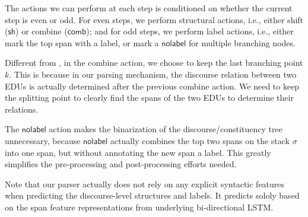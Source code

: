 \documentclass[11pt,letterpaper]{article}
\newcommand{\shift}{\ensuremath{\mathsf{sh}}\xspace}
\newcommand{\comb}{\ensuremath{\mathsf{comb}}\xspace}
\newcommand{\nolabel}{\ensuremath{\mathsf{nolabel}}\xspace}
\begin{document}
The actions we can perform at each step is conditioned on whether the current step is even or odd.
For even steps, we perform structural actions, i.e., either shift (\shift) or combine (\comb);
and for odd steps, we perform label actions, i.e., either mark the top span with a label, or 
mark a \nolabel for multiple branching nodes.

Different from , in the combine action, we choose to keep the last 
branching point $k$. This is because in our parsing mechanism,
the discourse relation between two EDUs is actually determined after the previous combine action.
We need to keep the splitting point to clearly find the spans of the two EDUs to determine their relations.

The \nolabel action makes the binarization of the discourse/constituency tree unnecessary,
because \nolabel actually combines the top two spans on the stack $\sigma$ into one span,
but without annotating the new span a label.
This greatly simplifies the pre-processing and post-processing efforts needed.


\begin{table}
  \begin{center}
  \end{center}
  \caption{Accuracies on PTB-RST at constituency and discourse levels. 
    \label{tab:internal-acc}
  }
  \vspace{-0.4cm}
\end{table}

Note that our parser actually does not rely on any explicit syntactic features when predicting
the discourse-level structures and labels. It predicts sololy based
on the span feature representations from underlying bi-directional LSTM.
\end{document}
